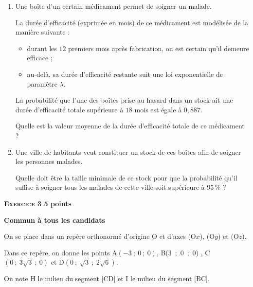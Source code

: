 \documentclass[10pt,a4paper]{article}
\begin{document}
\begin{enumerate}
\item Une boîte d'un certain médicament permet de soigner un malade.

La durée d'efficacité (exprimée en mois) de ce médicament est modélisée de la manière
suivante :

\begin{itemize}
\item durant les $12$ premiers mois après fabrication, on est certain qu'il demeure efficace ;
\item au-delà, sa durée d'efficacité restante suit une loi exponentielle de paramètre 
$\lambda$.
\end{itemize}

La probabilité que l'une des boîtes prise au hasard dans un stock ait une durée d'efficacité totale supérieure à $18$ mois est égale à $0,887$.

Quelle est la valeur moyenne de la durée d'efficacité totale de ce médicament ?
\item Une ville de  habitants veut constituer un stock de ces boîtes afin de soigner les personnes malades.

Quelle doit être la taille minimale de ce stock pour que la probabilité qu'il suffise à soigner tous les malades de cette ville soit supérieure à $95$\,\% ?
\end{enumerate}

\vspace{0,5cm}

 \textbf{\textsc{\bf Exercice 3} \hfill 5 points}
 
\medskip

\textbf{Commun à tous les candidats}

\bigskip

On se place dans un repère orthonormé d'origine O et d'axes (O$x$), (O$y$) et (O$z$).

Dans ce repère, on donne les points A$(- 3~;~0~;~0)$, B(3~;~0~;~0) , C$\left(0~;~3\sqrt{3}~;~0\right)$ et D$\left(0~;~\sqrt{3}~;~2\sqrt{6}\right)$.

On note H le milieu du segment [CD] et I le milieu du segment [BC].
\end{document}
